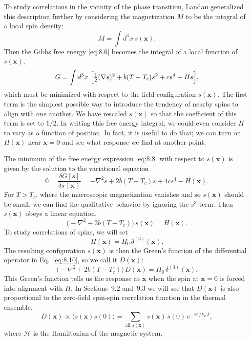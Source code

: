 To study correlations in the vicinity of the phase transition, Landau
generalized this description further by considering the magnetization $M$ to
be the integral of a local spin density:
\begin{equation}
  M = \int d^3x\ s(\mathbf{x}) .
  \label{eq:8.7}
\end{equation}
Then the Gibbs free energy \eqref{eq:8.6} becomes the integral of a local
function of $s(\mathbf{x})$,
\begin{equation}
  G = \int d^3x\ \Bigl[ \tfrac{1}{2}(\nabla s)^2 + b(T-T_c)s^2 + cs^4 - Hs
    \Bigr],
  \label{eq:8.8}
\end{equation}
which must be minimized with respect to the field configuration
$s(\mathbf{x})$.  The first term is the simplest possible way to introduce the
tendency of nearby spins to align with one another.  We have rescaled
$s(\mathbf{x})$ so that the coefficient of this term is set to $1/2$.  In
writing this free energy integral, we could even consider $H$ to vary as a
function of position.  In fact, it is useful to do that; we can turn on
$H(\mathbf{x})$ near $\mathbf{x} = 0$ and see what response we find at another
point.

The minimum of the free energy expression \eqref{eq:8.8} with respect to
$s(\mathbf{x})$ is given by the solution to the variational equation
\begin{equation}
  0 = \frac{\delta G[s]}{\delta s(\mathbf{x})} = -\nabla^2 s + 2b(T-T_c)s
    + 4cs^3 - H(\mathbf{x}) .
  \label{eq:8.9}
\end{equation}
For $T > T_c$, where the macroscopic magnetization vanishes and so
$s(\mathbf{x})$ should be small, we can find the qualitative behavior by
ignoring the $s^3$ term.  Then $s(\mathbf{x})$ obeys a linear equation,
\begin{equation}
  \bigl( -\nabla^2 + 2b(T-T_c) \bigr)\,s(\mathbf{x}) = H(\mathbf{x}) .
  \label{eq:8.10}
\end{equation}
To study correlations of spins, we will set
\begin{equation}
  H(\mathbf{x}) = H_0\,\delta^{(3)}(\mathbf{x}) .
  \label{eq:8.11}
\end{equation}
The resulting configuration $s(\mathbf{x})$ is then the Green's function of
the differential operator in Eq.~\eqref{eq:8.10}, so we call it $D(\mathbf{x})$:
\begin{equation}
  \bigl( -\nabla^2 + 2b(T-T_c) \bigr)\,D(\mathbf{x}) = H_0\,\delta^{(3)}(\mathbf{x}).
  \label{eq:8.12}
\end{equation}
This Green's function tells us the response at $\mathbf{x}$ when the spin at
$\mathbf{x} = 0$ is forced into alignment with $H$.  In Sections~9.2 and~9.3
we will see that $D(\mathbf{x})$ is also proportional to the zero-field
spin-spin correlation function in the thermal ensemble,
\begin{equation}
  D(\mathbf{x}) \propto \langle s(\mathbf{x})s(0)\rangle
  = \sum_{\text{all } s(\mathbf{x})} s(\mathbf{x})\,s(0)\,
    e^{-\mathcal{H}/k_BT} ,
  \label{eq:8.13}
\end{equation}
where $\mathcal{H}$ is the Hamiltonian of the magnetic system.

